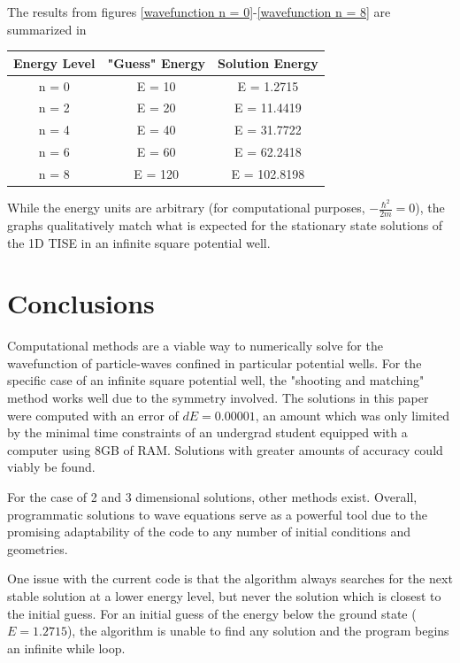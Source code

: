 \documentclass[12pt]{article}                  %
\begin{document}
The results from figures \ref{wavefunction n = 0}-\ref{wavefunction n = 8} are summarized in 

\begin{center}
\begin{tabular}{ |c|c|c| }
 \hline
 Energy Level & "Guess" Energy & Solution Energy \\ 
 \hline
 \hline
 n = 0 & E = 10 & E = 1.2715 \\ 
 \hline 
 n = 2 & E = 20 & E = 11.4419 \\ 
 \hline  
 n = 4 & E = 40 & E = 31.7722 \\ 
 \hline
 n = 6 & E = 60 & E = 62.2418 \\  
 \hline
 n = 8 & E = 120 & E = 102.8198 \\ 
 \hline
\end{tabular}
\end{center}

While the energy units are arbitrary (for computational purposes, $-\frac{\hbar^2}{2m} = 0$), the graphs qualitatively match what is expected for the stationary state solutions of the 1D TISE in an infinite square potential well. 


\section{Conclusions}
	Computational methods are a viable way to numerically solve for the wavefunction of particle-waves confined in particular potential wells. For the specific case of an infinite square potential well, the "shooting and matching" method works well due to the symmetry involved. The solutions in this paper were computed with an error of $dE = 0.00001$, an amount which was only limited by the minimal time constraints of an undergrad student equipped with a computer using 8GB of RAM. Solutions with greater amounts of accuracy could viably be found. 
	
For the case of 2 and 3 dimensional solutions, other methods exist. Overall, programmatic solutions to wave equations serve as a powerful tool due to the promising adaptability of the code to any number of initial conditions and geometries. 
	
One issue with the current code is that the algorithm always searches for the next stable solution at a lower energy level, but never the solution which is closest to the initial guess. For an initial guess of the energy below the ground state ($E = 1.2715$), the algorithm is unable to find any solution and the program begins an infinite while loop. 
\end{document}
